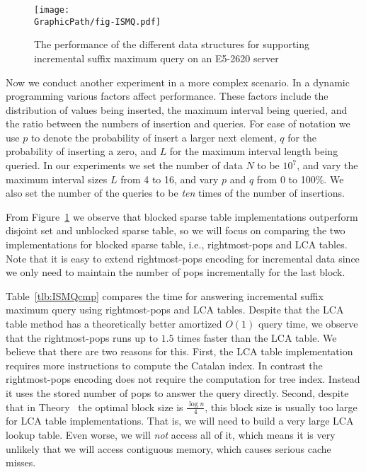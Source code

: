 \begin{figure}[!thb]
  \centering
  \texttt{[image: \\GraphicPath/fig-ISMQ.pdf]}
  \caption{The performance of the different data structures for
    supporting incremental suffix maximum query on an E5-2620 server}
  \label{fig:fig-ISMQcmp}
\end{figure}

Now we conduct another experiment in a more complex scenario.  In a
dynamic programming various factors affect performance.  These factors
include the distribution of values being inserted, the maximum
interval being queried, and the ratio between the numbers of insertion
and queries.  For ease of notation we use $p$ to denote the
probability of insert a larger next element, $q$ for the probability
of inserting a zero, and $L$ for the maximum interval length being
queried.  In our experiments we set the number of data $N$ to be
$10^7$, and vary the maximum interval sizes $L$ from 4 to 16, and vary
$p$ and $q$ from 0 to 100\%.  We also set the number of the queries to
be {\em ten} times of the number of insertions.

From Figure~\ref{fig:fig-ISMQcmp} we observe that blocked sparse table
implementations outperform disjoint set and unblocked sparse table, so
we will focus on comparing the two implementations for blocked sparse
table, i.e., rightmost-pops and LCA tables.  Note that it is easy to
extend rightmost-pops encoding for incremental data since we only need
to maintain the number of pops incrementally for the last block.

Table~\ref{tlb:ISMQcmp} compares the time for answering incremental
suffix maximum query using rightmost-pops and LCA tables.  Despite that
the LCA table method has a theoretically better amortized $O(1)$ query
time, we observe that the rightmost-pops runs up to $1.5$ times faster
than the LCA table.  We believe that there are two reasons for this.
First, the LCA table implementation requires more instructions to
compute the Catalan index.  In contrast the rightmost-pops encoding does
not require the computation for tree index.  Instead it uses the stored
number of pops to answer the query directly.  Second, despite that in
Theory~\cite{Fischer2006TheoreticalAP} the optimal block size is
$\frac{\log n}{4}$, this block size is usually too large for LCA table
implementations.  That is, we will need to build a very large LCA lookup
table.  Even worse, we will {\em not} access all of it, which means it
is very unlikely that we will access contiguous memory, which causes
serious cache misses.


